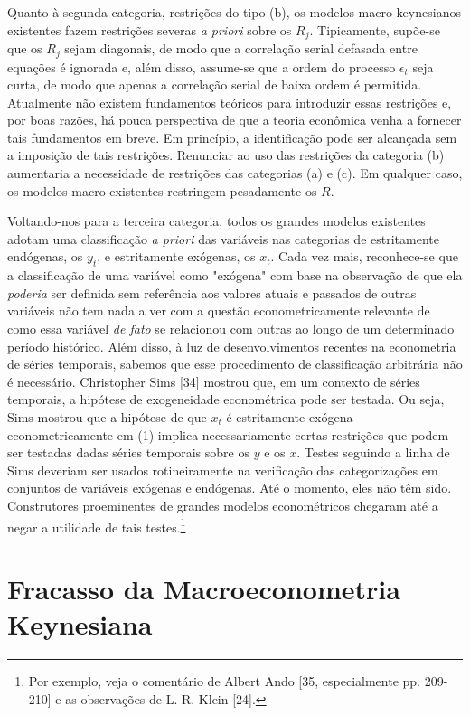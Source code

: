 \documentclass[12pt]{article}
\begin{document}
Quanto à segunda categoria, restrições do tipo (b), os modelos macro keynesianos existentes fazem restrições severas \textit{a priori} sobre os $R_j$. Tipicamente, supõe-se que os $R_j$ sejam diagonais, de modo que a correlação serial defasada entre equações é ignorada e, além disso, assume-se que a ordem do processo $\epsilon_t$ seja curta, de modo que apenas a correlação serial de baixa ordem é permitida. Atualmente não existem fundamentos teóricos para introduzir essas restrições e, por boas razões, há pouca perspectiva de que a teoria econômica venha a fornecer tais fundamentos em breve. Em princípio, a identificação pode ser alcançada sem a imposição de tais restrições. Renunciar ao uso das restrições da categoria (b) aumentaria a necessidade de restrições das categorias (a) e (c). Em qualquer caso, os modelos macro existentes restringem pesadamente os $R$.

Voltando-nos para a terceira categoria, todos os grandes modelos existentes adotam uma classificação \textit{a priori} das variáveis nas categorias de estritamente endógenas, os $y_t$, e estritamente exógenas, os $x_t$. Cada vez mais, reconhece-se que a classificação de uma variável como "exógena" com base na observação de que ela \textit{poderia} ser definida sem referência aos valores atuais e passados de outras variáveis não tem nada a ver com a questão econometricamente relevante de como essa variável \textit{de fato} se relacionou com outras ao longo de um determinado período histórico. Além disso, à luz de desenvolvimentos recentes na econometria de séries temporais, sabemos que esse procedimento de classificação arbitrária não é necessário. Christopher Sims [34] mostrou que, em um contexto de séries temporais, a hipótese de exogeneidade econométrica pode ser testada. Ou seja, Sims mostrou que a hipótese de que $x_t$ é estritamente exógena econometricamente em (1) implica necessariamente certas restrições que podem ser testadas dadas séries temporais sobre os $y$ e os $x$. Testes seguindo a linha de Sims deveriam ser usados rotineiramente na verificação das categorizações em conjuntos de variáveis exógenas e endógenas. Até o momento, eles não têm sido. Construtores proeminentes de grandes modelos econométricos chegaram até a negar a utilidade de tais testes.\footnote{Por exemplo, veja o comentário de Albert Ando [35, especialmente pp. 209-210] e as observações de L. R. Klein [24].}

\section{Fracasso da Macroeconometria Keynesiana}
\end{document}
